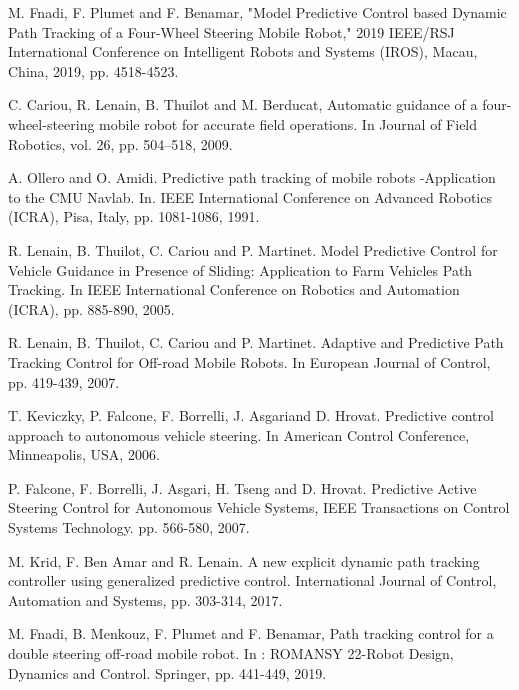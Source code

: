 \documentclass{IEEEtran}
\begin{document}
\begin{thebibliography}{00}

 M. Fnadi, F. Plumet and F. Benamar, "Model Predictive Control based Dynamic Path Tracking of a Four-Wheel Steering Mobile Robot," 2019 IEEE/RSJ International Conference on Intelligent Robots and Systems (IROS), Macau, China, 2019, pp. 4518-4523.

 C. Cariou, R. Lenain, B. Thuilot and M. Berducat, Automatic guidance of a four-wheel-steering mobile robot for accurate field operations. In Journal of Field Robotics, vol. 26, pp. 504–518, 2009.

 A. Ollero and O. Amidi. Predictive path tracking of mobile robots -Application to the CMU Navlab. In. IEEE International Conference on Advanced Robotics (ICRA), Pisa, Italy, pp. 1081-1086, 1991.

 R. Lenain, B. Thuilot, C. Cariou and P. Martinet. Model Predictive Control for Vehicle Guidance in Presence of Sliding: Application to Farm Vehicles Path Tracking. In IEEE International Conference on Robotics and Automation (ICRA), pp. 885-890, 2005.

 R. Lenain, B. Thuilot, C. Cariou and P. Martinet. Adaptive and Predictive Path Tracking Control for Off-road Mobile Robots. In European Journal of Control, pp. 419-439, 2007.

 T. Keviczky, P. Falcone, F. Borrelli, J. Asgariand D. Hrovat. Predictive control approach to autonomous vehicle steering. In American Control Conference, Minneapolis, USA, 2006.

 P. Falcone, F. Borrelli, J. Asgari, H. Tseng and D. Hrovat. Predictive Active Steering Control for Autonomous Vehicle Systems, IEEE Transactions on Control Systems Technology. pp. 566-580, 2007.

M. Krid, F. Ben Amar and R. Lenain. A new explicit dynamic path tracking controller using generalized predictive control. International Journal of Control, Automation and Systems, pp. 303-314, 2017.

 M. Fnadi, B. Menkouz, F. Plumet and F. Benamar, Path tracking control for a double steering off-road mobile robot. In : ROMANSY 22-Robot Design, Dynamics and Control. Springer, pp. 441-449, 2019.


\end{thebibliography}
\end{document}

